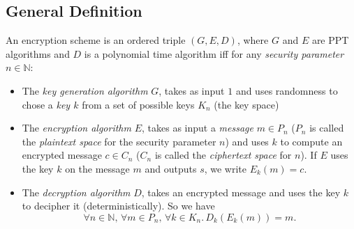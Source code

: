 \subsection{General Definition}

\begin{definition}
 An encryption scheme is an ordered triple $(G, E, D)$, where $G$ and $E$ are PPT algorithms and $D$ is a polynomial time algorithm iff for any \emph{security parameter} $n\in\mathbb{N}$:
 \begin{itemize}
  \item The \emph{key generation algorithm} $G$, takes as input $1$ and uses randomness to chose a \emph{key $k$} from a set of possible keys $K_n$ (the key space)
  \item The \emph{encryption algorithm} $E$, takes as input a \emph{message} $m\in P_n$ ($P_n$ is called the \emph{plaintext space} for the security parameter $n$) and uses $k$ to compute an encrypted message $c\in C_n$ ($C_n$ is called the \emph{ciphertext space} for $n$). If $E$ uses the key $k$ on the message $m$ and outputs $s$, we write $E_k(m)=c$.
  \item The \emph{decryption algorithm} $D$, takes an encrypted message and uses the key $k$ to decipher it (deterministically). So we have $$\forall n\in\mathbb{N},\,\forall m\in P_n,\,\forall k \in K_n.\,D_k(E_k(m))=m.$$
 \end{itemize}
\end{definition}

